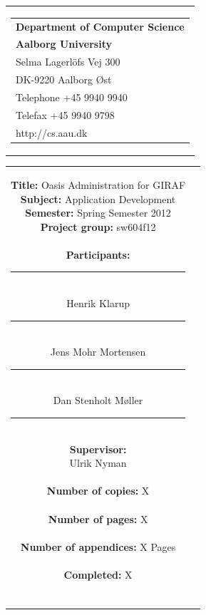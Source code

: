 \begin{nopagebreak}
\samepage 
\begin{tabular}{r}
\parbox{\textwidth}{
\hfill \parbox{6.2cm}{\begin{tabular}{l}
{\textsf\small \textbf{Department of Computer Science }}\\
{\textsf\small  \textbf{Aalborg University}}\\
{\textsf\small Selma Lagerl\"{o}fs Vej 300}\\
{\textsf\small DK-9220 Aalborg Øst}\\
{\textsf\small Telephone +45 9940 9940}\\
{\textsf\small Telefax +45 9940 9798}\\
{\textsf\small http://cs.aau.dk}
\end{tabular}}}
\end{tabular}

\begin{tabular}{cc}
\parbox{7cm}{
\vspace{-2.15cm}
\textbf{Title:} 
Oasis Administration for GIRAF\\
\textbf{Subject:} 
Application Development\\
\textbf{Semester:} Spring Semester 2012\\
\textbf{Project group:} sw604f12\\ \\
\textbf{Participants:} \\
\rule[-0.1cm]{5cm}{0.01cm} \\
Henrik Klarup \\
\rule[-0.1cm]{5cm}{0.01cm} \\
Jens Mohr Mortensen \\
\rule[-0.1cm]{5cm}{0.01cm} \\
Dan Stenholt M\o{}ller \\
\rule[-0.1cm]{5cm}{0.01cm} \\
\textbf{Supervisor:} \\
Ulrik Nyman\\ \\
\textbf{Number of copies:}
X \\ \\
\textbf{Number of pages:}
X \\ \\
\textbf{Number of appendices:}
X Pages\\ \\
\textbf{Completed:}
X \\ \\
}


\end{tabular}
\end{nopagebreak}
